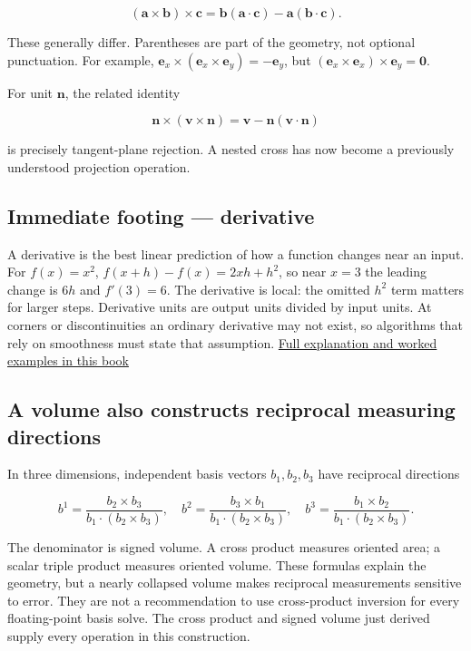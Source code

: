 \[
(\mathbf a\times\mathbf b)\times\mathbf c
=\mathbf b(\mathbf a\cdot\mathbf c)-\mathbf a(\mathbf b\cdot\mathbf c).
\]

These generally differ. Parentheses are part of the geometry, not optional punctuation. For example, \(\mathbf e_x\times(\mathbf e_x\times\mathbf e_y)=-\mathbf e_y\), but \((\mathbf e_x\times\mathbf e_x)\times\mathbf e_y=\mathbf0\).

For unit \(\mathbf n\), the related identity

\[
\mathbf n\times(\mathbf v\times\mathbf n)
=\mathbf v-\mathbf n(\mathbf v\cdot\mathbf n)
\]

is precisely tangent-plane rejection. A nested cross has now become a previously understood projection operation.

\subsection{Immediate footing --- derivative}\label{01-foundations-i-ch017-immediate-footing-derivative}

A derivative is the best linear prediction of how a function changes near an input. For \(f(x)=x^2\), \(f(x+h)-f(x)=2xh+h^2\), so near \(x=3\) the leading change is \(6h\) and \(f'(3)=6\). The derivative is local: the omitted \(h^2\) term matters for larger steps. Derivative units are output units divided by input units. At corners or discontinuities an ordinary derivative may not exist, so algorithms that rely on smoothness must state that assumption. \hyperref[01-foundations-i-ch020-functions-limits-continuity-and-scalar-change]{Full explanation and worked examples in this book}

\subsection{A volume also constructs reciprocal measuring directions}\label{01-foundations-i-ch017-a-volume-also-constructs-reciprocal-measuring-directions}

In three dimensions, independent basis vectors \(b_1,b_2,b_3\) have reciprocal directions

\[
b^1=\frac{b_2\times b_3}{b_1\cdot(b_2\times b_3)},\quad
b^2=\frac{b_3\times b_1}{b_1\cdot(b_2\times b_3)},\quad
b^3=\frac{b_1\times b_2}{b_1\cdot(b_2\times b_3)}.
\]

The denominator is signed volume. A cross product measures oriented area; a scalar triple product measures oriented volume. These formulas explain the geometry, but a nearly collapsed volume makes reciprocal measurements sensitive to error. They are not a recommendation to use cross-product inversion for every floating-point basis solve. The cross product and signed volume just derived supply every operation in this construction.

